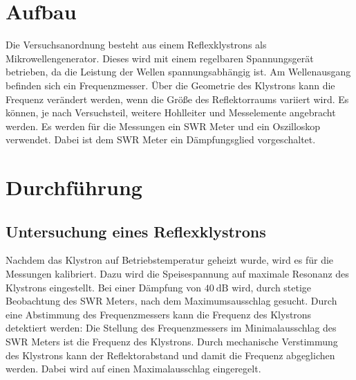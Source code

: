 \section{Aufbau}
Die Versuchsanordnung besteht aus einem Reflexklystrons als Mikrowellengenerator. Dieses wird mit einem regelbaren Spannungsgerät betrieben, da die Leistung der Wellen spannungsabhängig ist.
Am Wellenausgang befinden sich ein Frequenzmesser. Über die Geometrie des Klystrons kann die Frequenz verändert werden, wenn die Größe des Reflektorraums variiert wird. Es können, je nach Versuchsteil, weitere Hohlleiter und Messelemente angebracht werden.
Es werden für die Messungen ein SWR Meter und ein Oszilloskop verwendet. Dabei ist dem SWR Meter ein Dämpfungsglied vorgeschaltet.
\section{Durchführung}
\label{sec:Durchführung}
\subsection{Untersuchung eines Reflexklystrons}
\label{sec:durchfuehrung_1}
Nachdem das Klystron auf Betriebstemperatur geheizt wurde, wird es für die Messungen kalibriert.
Dazu wird die Speisespannung auf maximale Resonanz des Klystrons eingestellt. Bei einer Dämpfung von $\SI{40}{\deci\bel}$ wird, durch stetige Beobachtung des SWR Meters, nach dem Maximumsausschlag gesucht.
Durch eine Abstimmung des Frequenzmessers kann die Frequenz des Klystrons detektiert werden: Die Stellung des Frequenzmessers im Minimalausschlag des SWR Meters ist die Frequenz des Klystrons.
Durch mechanische Verstimmung des Klystrons kann der Reflektorabstand und damit die Frequenz abgeglichen werden. Dabei wird auf einen Maximalausschlag eingeregelt.

